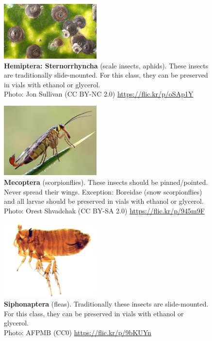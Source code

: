 \documentclass[letterpaper, 11pt]{article}
\begin{document}
\begin{figure}
  \caption{\textbf{Hemiptera: Sternorrhyncha} (scale insects, aphids). These insects are traditionally slide-mounted. For this class, they can be preserved in vials with ethanol or glycerol.\\ Photo: Jon Sullivan (CC BY-NC 2.0) \url{https://flic.kr/p/oSAp1Y}}
  \includegraphics[width=0.45\textwidth]{HemipteraSternorrhyncha}
\end{figure}

\clearpage

\begin{figure}
  \caption{\textbf{Mecoptera} (scorpionflies). These insects should be pinned/pointed. Never spread their wings. Exception: Boreidae (snow scorpionflies) and all larvae should be preserved in vials with ethanol or glycerol.\\ Photo: Orest Shvadchak (CC BY-SA 2.0) \url{https://flic.kr/p/945m9F}}
  \includegraphics[width=0.45\textwidth]{Mecoptera}
\end{figure}

\begin{figure}
  \caption{\textbf{Siphonaptera} (fleas). Traditionally these insects are slide-mounted. For this class, they can be preserved in vials with ethanol or glycerol.\\ Photo: AFPMB (CC0) \url{https://flic.kr/p/9bKUYn}}
  \includegraphics[width=0.45\textwidth]{Siphonaptera}
\end{figure}
\end{document}
